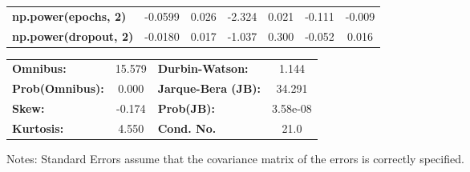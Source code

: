 \begin{center}
\begin{tabular}{lcccccc}
\textbf{np.power(epochs, 2)}         &      -0.0599  &        0.026     &    -2.324  &         0.021        &       -0.111    &       -0.009     \\
\textbf{np.power(dropout, 2)}        &      -0.0180  &        0.017     &    -1.037  &         0.300        &       -0.052    &        0.016     \\
\bottomrule
\end{tabular}
\begin{tabular}{lclc}
\textbf{Omnibus:}       & 15.579 & \textbf{  Durbin-Watson:     } &    1.144  \\
\textbf{Prob(Omnibus):} &  0.000 & \textbf{  Jarque-Bera (JB):  } &   34.291  \\
\textbf{Skew:}          & -0.174 & \textbf{  Prob(JB):          } & 3.58e-08  \\
\textbf{Kurtosis:}      &  4.550 & \textbf{  Cond. No.          } &     21.0  \\
\bottomrule
\end{tabular}
\end{center}

Notes: \newline
 [1] Standard Errors assume that the covariance matrix of the errors is correctly specified.